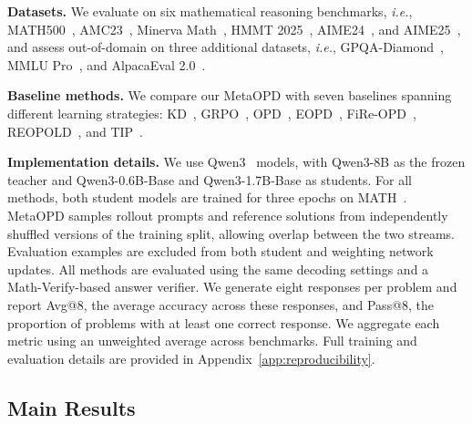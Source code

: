 \documentclass{article}
\theoremstyle{plain}
\theoremstyle{definition}
\theoremstyle{remark}
\begin{document}
\textbf{Datasets.} We evaluate on six mathematical reasoning benchmarks, \textit{i.e.}, MATH500~\citep{hendrycks2021measuring,lightman2024let}, AMC23~\citep{an2024qwen2}, Minerva Math~\citep{lewkowycz2022solving}, HMMT 2025~\citep{balunovic2026matharena}, AIME24~\citep{aime24}, and AIME25~\citep{zhang2025american}, and assess out-of-domain on three additional datasets, \textit{i.e.}, GPQA-Diamond~\citep{rein2023gpqa}, MMLU Pro~\citep{wang2024mmlu}, and AlpacaEval 2.0~\citep{dubois2024length}. 

\textbf{Baseline methods.} We compare our MetaOPD with seven baselines spanning different learning strategies: KD~\citep{hinton2015distilling}, GRPO~\citep{shao2024deepseekmath}, OPD~\citep{agarwal2024policy}, EOPD~\citep{jin2026entropy}, 
FiRe-OPD~\citep{li2026filter},
REOPOLD~\citep{ko2026scaling}, and TIP~\citep{xu2026tip}.

\textbf{Implementation details.} We use Qwen3~\citep{yang2025qwen3} models, with Qwen3-8B as the frozen teacher and Qwen3-0.6B-Base and Qwen3-1.7B-Base as students. For all methods, both student models are trained for three epochs on MATH~\citep{hendrycks2021measuring}. 
MetaOPD samples rollout prompts and reference solutions from independently shuffled versions of the training split, allowing overlap between the two streams. 
Evaluation examples are excluded from both student and weighting network updates. All methods are evaluated using the same decoding settings and a Math-Verify-based answer verifier. We generate eight responses per problem and report Avg@8, the average accuracy across these responses, and Pass@8, the proportion of problems with at least one correct response. We aggregate each metric using an unweighted average across benchmarks. Full training and evaluation details are provided in Appendix~\ref{app:reproducibility}.




\subsection{Main Results}
\label{sec:main_results}
\end{document}
